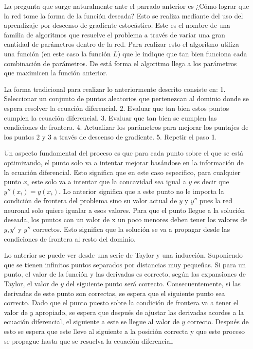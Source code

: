 \documentclass[11pt]{article}
\begin{document}
La pregunta que surge naturalmente ante el parrado anterior es ¿Cómo
lograr que la red tome la forma de la función deseada? Esto se realiza
mediante del uso del aprendizaje por descenso de gradiente estocástico.
Este es el nombre de una familia de algoritmos que resuelve el problema
a través de variar una gran cantidad de parámetros dentro de la red.
Para realizar esto el algoritmo utiliza una función (en este caso la
función \(L\)) que le indique que tan bien funciona cada combinación de
parámetros. De está forma el algoritmo llega a los parámetros que
maximicen la función anterior.

La forma tradicional para realizar lo anteriormente descrito consiste
en: 1. Seleccionar un conjunto de puntos aleatorios que pertenezcan al
dominio donde se espera resolver la ecuación diferencial. 2. Evaluar que
tan bien estos puntos cumplen la ecuación diferencial. 3. Evaluar que
tan bien se cumplen las condiciones de frontera. 4. Actualizar los
parámetros para mejorar los puntajes de los puntos 2 y 3 a través de
descenso de gradiente. 5. Repetir el paso 1.

Un aspecto fundamental del proceso es que para cada punto sobre el que
se está optimizando, el punto solo va a intentar mejorar basándose en la
información de la ecuación diferencial. Esto significa que en este caso
especifico, para cualquier punto \(x_i\) este solo va a intentar que la
concavidad sea igual a \(y\) es decir que \(y''(x_i) = y(x_i)\). Lo
anterior significa que a este punto no le importa la condición de
frontera del problema sino su valor actual de \(y\) y \(y''\) pues la
red neuronal solo quiere igualar a esos valores. Para que el punto
llegue a la solución deseada, los puntos con un valor de x un poco
menores deben tener los valores de \(y,y'\) y \(y''\) correctos. Esto
significa que la solución se va a propagar desde las condiciones de
frontera al resto del dominio.

Lo anterior se puede ver desde una serie de Taylor y una inducción.
Suponiendo que se tienen infinitos puntos separados por distancias muy
pequeñas. Si para un punto, el valor de la función y las derivadas es
correcto, según las expansiones de Taylor, el valor de \(y\) del
siguiente punto será correcto. Consecuentemente, si las derivadas de
este punto son correctas, se espera que el siguiente punto sea correcto.
Dado que el punto puesto sobre la condición de frontera va a tener el
valor de \(y\) apropiado, se espera que después de ajustar las derivadas
acordes a la ecuación diferencial, el siguiente a este se llegue al
valor de \(y\) correcto. Después de esto se espera que este lleve al
siguiente a la posición correcta y que este proceso se propague hasta
que se resuelva la ecuación diferencial.
\end{document}
